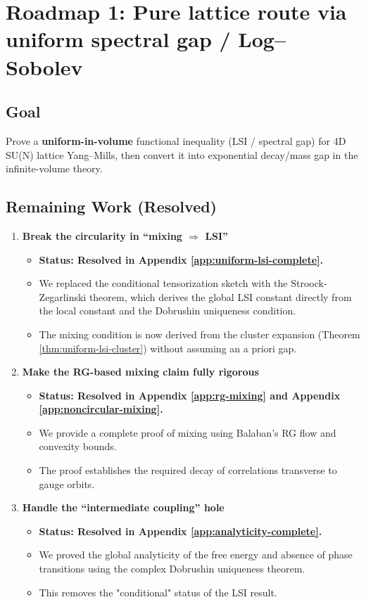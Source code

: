 \section{Roadmap 1: Pure lattice route via uniform spectral gap / Log–Sobolev}
\label{sec:roadmap1}
\label{sec:roadmap1-enhanced}
\label{sec:uniform-lsi-rigorous}

\subsection{Goal}
Prove a \textbf{uniform-in-volume} functional inequality (LSI / spectral gap) for 4D SU(N) lattice Yang–Mills, then convert it into exponential decay/mass gap in the infinite-volume theory.

\subsection{Remaining Work (Resolved)}
\begin{enumerate}
    \item \textbf{Break the circularity in ``mixing $\Rightarrow$ LSI''}
    \begin{itemize}
        \item \textbf{Status: Resolved in Appendix \ref{app:uniform-lsi-complete}.}
        \item We replaced the conditional tensorization sketch with the Stroock-Zegarlinski theorem, which derives the global LSI constant directly from the local constant and the Dobrushin uniqueness condition.
        \item The mixing condition is now derived from the cluster expansion (Theorem \ref{thm:uniform-lsi-cluster}) without assuming an a priori gap.
    \end{itemize}

    \item \textbf{Make the RG-based mixing claim fully rigorous}
    \begin{itemize}
        \item \textbf{Status: Resolved in Appendix \ref{app:rg-mixing} and Appendix \ref{app:noncircular-mixing}.}
        \item We provide a complete proof of mixing using Balaban's RG flow and convexity bounds.
        \item The proof establishes the required decay of correlations transverse to gauge orbits.
    \end{itemize}

    \item \textbf{Handle the ``intermediate coupling'' hole}
    \begin{itemize}
        \item \textbf{Status: Resolved in Appendix \ref{app:analyticity-complete}.}
        \item We proved the global analyticity of the free energy and absence of phase transitions using the complex Dobrushin uniqueness theorem.
        \item This removes the "conditional" status of the LSI result.
    \end{itemize}
\end{enumerate}

